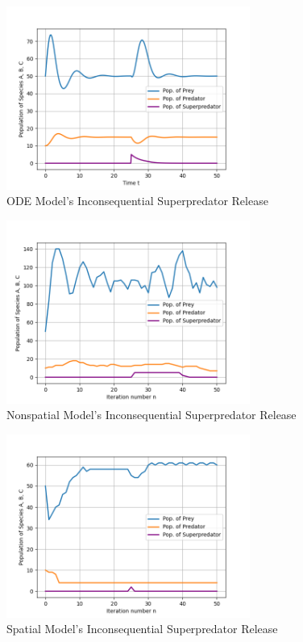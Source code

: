 \documentclass[journal]{IEEEtran}
\begin{document}
\begin{figure}[h]
    \vspace{-4mm}
    \centering
    \includegraphics[width=8cm]{images/inconsequential_superpredator_release_ode.png}
    \vspace{-8mm}
    \caption{ODE Model's Inconsequential Superpredator Release}
    \label{fig:inconsequential_superpredator_release_ode}
\end{figure}
\begin{figure}[h]
    \vspace{-8mm}
    \centering
    \includegraphics[width=8cm]{images/inconsequential_superpredator_release_nonspatial.png}
    \vspace{-8mm}
    \caption{Nonspatial Model's Inconsequential Superpredator Release}
    \label{fig:inconsequential_superpredator_release_nonspatial}
\end{figure}
\begin{figure}[h]
    \vspace{-8mm}
    \centering
    \includegraphics[width=8cm]{images/inconsequential_superpredator_release_spatial.png}
    \vspace{-8mm}
    \caption{Spatial Model's Inconsequential Superpredator Release}
    \label{fig:inconsequential_superpredator_release_spatial}
\end{figure}
\end{document}
